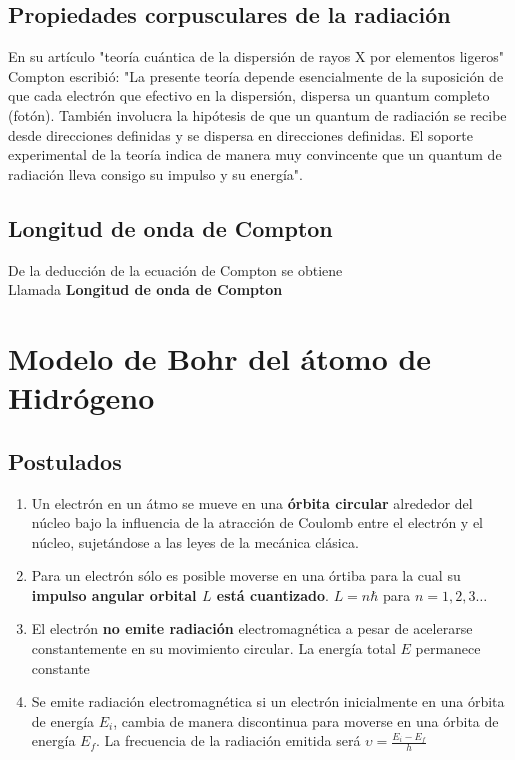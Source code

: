 \documentclass[oneside]{book}
\numberwithin{equation}{section}
\numberwithin{figure}{section}
\numberwithin{table}{section}
\begin{document}
			\subsection{Propiedades corpusculares de la radiación}
			
				En su artículo "teoría cuántica de la dispersión de rayos X por elementos ligeros" Compton escribió: "La presente teoría depende esencialmente de la suposición de que cada electrón que efectivo en la dispersión, dispersa un quantum completo (fotón). También involucra la hipótesis de que un quantum de radiación se recibe desde direcciones definidas y se dispersa en direcciones definidas. El soporte experimental de la teoría indica de manera muy convincente que un quantum de radiación lleva consigo su impulso y su energía".
				
			\subsection{Longitud de onda de Compton}
			
				De la deducción de la ecuación de Compton se obtiene \\
				Llamada \textbf{Longitud de onda de Compton}
			
		\section{Modelo de Bohr del átomo de Hidrógeno}
			\subsection{Postulados}
			
				\begin{enumerate}
					\item Un electrón en un átmo se mueve en una \textbf{órbita circular} alrededor del núcleo bajo la influencia de la atracción de Coulomb entre el electrón y el núcleo, sujetándose a las leyes de la mecánica clásica.
					\item Para un electrón sólo es posible moverse en una órtiba para la cual su \textbf{impulso angular orbital $L$ está cuantizado}. $L=n \hbar$ para $n=1,2,3\ldots$
					\item El electrón \textbf{no emite radiación} electromagnética a pesar de acelerarse constantemente en su movimiento circular. La energía total $E$ permanece constante
					\item Se emite radiación electromagnética si un electrón inicialmente en una órbita de energía $E_i$, cambia de manera discontinua para moverse en una órbita de energía $E_f$. La frecuencia de la radiación emitida será $\upsilon=\frac{E_i-E_f}{h}$
				\end{enumerate}							
			
\end{document}
